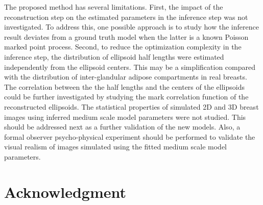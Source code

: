 \documentclass[journal]{IEEEtran}
\begin{document}
The proposed method has several limitations. First, the impact of the
reconstruction step on the estimated parameters in the inference step
was not investigated. To address this, one possible approach is to
study how the inference result deviates from a ground truth model when
the latter is a known Poisson marked point process. Second, to reduce
the optimization complexity in the inference step, the distribution of
ellipsoid half lengths were estimated independently from the ellipsoid
centers. This may be a simplification compared with the distribution
of inter-glandular adipose compartments in real breasts. The
correlation between the the half lengths and the centers of the
ellipsoids could be further investigated by studying the mark
correlation function of the reconstructed ellipsoids. The statistical
properties of simulated 2D and 3D breast images using inferred medium
scale model parameters were not studied. This should be addressed next
as a further validation of the new models. Also, a formal observer
psycho-physical experiment should be performed to validate the visual
realism of images simulated using the fitted medium scale model
parameters.





%

\section*{Acknowledgment}
\end{document}
